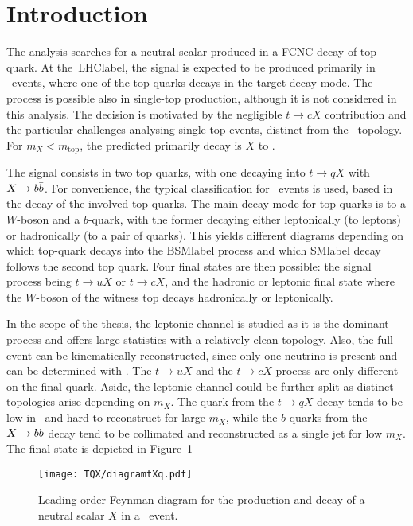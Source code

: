 \section{Introduction}

The analysis searches for a neutral scalar produced in a FCNC decay of top quark. At the~\acrshort{LHClabel}, the signal is expected to be produced primarily in \ttbar\ events, where one of the top quarks decays in the target decay mode. The process is possible also in single-top production, although it is not considered in this analysis. The decision is motivated by the negligible $t\to cX$ contribution and the particular challenges analysing single-top events, distinct from the \ttbar\ topology. For $m_X<m_\text{top}$, the predicted primarily decay is $X$ to \bbar.

The signal consists in two top quarks, with one decaying into $t\to qX$ with $X\to b\bar{b}$. For convenience, the typical classification for \ttbar\ events is used, based in the decay of the involved top quarks. The main decay mode for top quarks is to a $W$-boson and a $b$-quark, with the former decaying either leptonically (to leptons) or hadronically (to a pair of quarks). This yields different diagrams depending on which top-quark decays into the \acrshort{BSMlabel} process and which \acrshort{SMlabel} decay follows the second top quark. Four final states are then possible: the signal process being $t\to uX$ or $t\to cX$, and the hadronic or leptonic final state where the $W$-boson of the witness top decays hadronically or leptonically.

In the scope of the thesis, the leptonic channel is studied as it is the dominant process and offers large statistics with a relatively clean topology. Also, the full event can be kinematically reconstructed, since only one neutrino is present and can be determined with \MET. The $t\to uX$ and the $t\to cX$ process are only different on the final quark. Aside, the leptonic channel could be further split as distinct topologies arise depending on $m_X$. The quark from the $t\to qX$ decay tends to be low in \pT\ and hard to reconstruct for large $m_X$, while the $b$-quarks from the $X\to b\bar{b}$ decay tend to be collimated and reconstructed as a single jet for low $m_X$. The final state is depicted in Figure~\ref{tqx:feynman2}

\begin{figure}[htbp]
    \RawFloats
    \begin{center}
    \texttt{[image: TQX/diagramtXq.pdf]}
    \caption{
        Leading-order Feynman diagram for the production and decay of a neutral scalar $X$ in a \ttbar\ event.
    }
    \label{tqx:feynman2}
    \end{center}
\end{figure}

